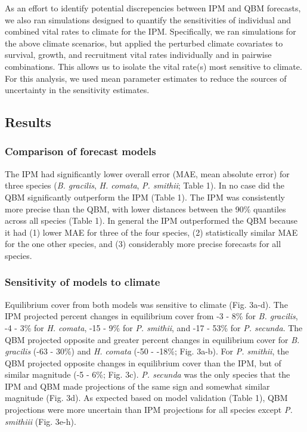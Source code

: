 \documentclass[12pt,]{article}
\begin{document}
As an effort to identify potential discrepencies between IPM and QBM
forecasts, we also ran simulations designed to quantify the
sensitivities of individual and combined vital rates to climate for the
IPM. Specifically, we ran simulations for the above climate scenarios,
but applied the perturbed climate covariates to survival, growth, and
recruitment vital rates individually and in pairwise combinations. This
allows us to isolate the vital rate(s) most sensitive to climate. For
this analysis, we used mean parameter estimates to reduce the sources of
uncertainty in the sensitivity estimates.

\subsection{Results}\label{results}

\subsubsection{Comparison of forecast
models}\label{comparison-of-forecast-models}

The IPM had significantly lower overall error (MAE, mean absolute error)
for three species (\emph{B. gracilis}, \emph{H. comata}, \emph{P.
smithii}; Table 1). In no case did the QBM significantly outperform the
IPM (Table 1). The IPM was consistently more precise than the QBM, with
lower distances between the 90\% quantiles across all species (Table 1).
In general the IPM outperformed the QBM because it had (1) lower MAE for
three of the four species, (2) statistically similar MAE for the one
other species, and (3) considerably more precise forecasts for all
species.

\subsubsection{Sensitivity of models to
climate}\label{sensitivity-of-models-to-climate}

Equilibrium cover from both models was sensitive to climate (Fig. 3a-d).
The IPM projected percent changes in equilibrium cover from -3 - 8\% for
\emph{B. gracilis}, -4 - 3\% for \emph{H. comata}, -15 - 9\% for
\emph{P. smithii}, and -17 - 53\% for \emph{P. secunda}. The QBM
projected opposite and greater percent changes in equilibrium cover for
\emph{B. gracilis} (-63 - 30\%) and \emph{H. comata} (-50 - -18\%; Fig.
3a-b). For \emph{P. smithii}, the QBM projected opposite changes in
equilibrium cover than the IPM, but of similar magnitude (-5 - 6\%; Fig.
3c). \emph{P. secunda} was the only species that the IPM and QBM made
projections of the same sign and somewhat similar magnitude (Fig. 3d).
As expected based on model validation (Table 1), QBM projections were
more uncertain than IPM projections for all species except \emph{P.
smithiii} (Fig. 3e-h).
\end{document}
